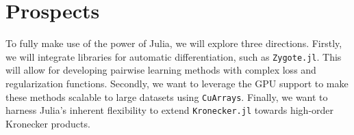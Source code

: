 \documentclass{juliacon}
\begin{document}
\section{Prospects}

To fully make use of the power of Julia, we will explore three directions. Firstly, we will integrate libraries for automatic differentiation, such as \texttt{Zygote.jl}. This will allow for developing pairwise learning methods with complex loss and regularization functions. Secondly, we want to leverage the GPU support to make these methods scalable to large datasets using \texttt{CuArrays}. Finally, we want to harness Julia's inherent flexibility to extend \texttt{Kronecker.jl} towards high-order Kronecker products.


\end{document}

